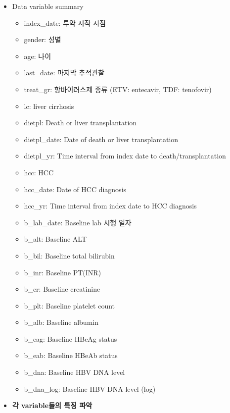 \documentclass[
]{article}
\newenvironment{Shaded}{\begin{snugshade}}{\end{snugshade}}
\newcommand{\CommentTok}[1]{\textcolor[rgb]{0.56,0.35,0.01}{\textit{#1}}}
\newcommand{\FunctionTok}[1]{\textcolor[rgb]{0.00,0.00,0.00}{#1}}
\newcommand{\NormalTok}[1]{#1}
\newcommand{\SpecialCharTok}[1]{\textcolor[rgb]{0.00,0.00,0.00}{#1}}
\providecommand{\tightlist}{%
  \setlength{\itemsep}{0pt}\setlength{\parskip}{0pt}}
\begin{document}
\begin{itemize}
\tightlist
\item
  Data variable summary

  \begin{itemize}
  \tightlist
  \item
    index\_date: 투약 시작 시점
  \item
    gender: 성별
  \item
    age: 나이
  \item
    last\_date: 마지막 추적관찰
  \item
    treat\_gr: 항바이러스제 종류 (ETV: entecavir, TDF: tenofovir)
  \item
    lc: liver cirrhosis
  \item
    dietpl: Death or liver transplantation
  \item
    dietpl\_date: Date of death or liver transplantation
  \item
    dietpl\_yr: Time interval from index date to death/transplantation
  \item
    hcc: HCC
  \item
    hcc\_date: Date of HCC diagnosis
  \item
    hcc\_yr: Time interval from index date to HCC diagnosis
  \item
    b\_lab\_date: Baseline lab 시행 일자
  \item
    b\_alt: Baseline ALT
  \item
    b\_bil: Baseline total bilirubin
  \item
    b\_inr: Baseline PT(INR)
  \item
    b\_cr: Baseline creatinine
  \item
    b\_plt: Baseline platelet count
  \item
    b\_alb: Baseline albumin
  \item
    b\_eag: Baseline HBeAg status
  \item
    b\_eab: Baseline HBeAb status
  \item
    b\_dna: Baseline HBV DNA level
  \item
    b\_dna\_log: Baseline HBV DNA level (log)\\
  \end{itemize}
\item
  \textbf{각 variable들의 특징 파악}
\end{itemize}

\begin{Shaded}
\end{Shaded}
\end{document}

